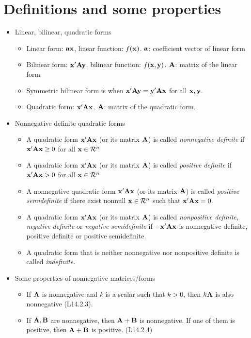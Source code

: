 \documentclass[a4paper, oneside]{book}
\begin{document}
\section{Definitions and some properties}
\begin{itemize}
\item Linear, bilinear, quadratic forms
	\begin{itemize}
	\item Linear form:  $\mathbf{ax}$, linear function: $f(\mathbf{x})$. $\mathbf{a}$: coefficient vector of linear form
	\item Bilinear form:  $\mathbf{x'Ay}$, bilinear function: $f(\mathbf{x,y})$. $\mathbf{A}$: matrix of the linear form
	\item Symmetric bilinear form is when $\mathbf{x'Ay} = \mathbf{y'Ax}$ for all $\mathbf{x,y}$.  
	\item Quadratic form: $\mathbf{x'Ax}$. $\mathbf{A}$: matrix of the quadratic form.
	\end{itemize}
\item Nonnegative definite quadratic forms
	\begin{itemize}
	\item A quadratic form $\mathbf{x'Ax}$ (or its matrix $\mathbf{A}$) is called \textit{nonnegative definite} if $\mathbf{x'Ax}\ge 0$ for all $\mathbf{x} \in \mathcal{R}^n$
	\item A quadratic form $\mathbf{x'Ax}$ (or its matrix $\mathbf{A}$) is called \textit{positive definite} if $\mathbf{x'Ax}> 0$ for all $\mathbf{x} \in \mathcal{R}^n$
	\item A nonnegative quadratic form $\mathbf{x'Ax}$ (or its matrix $\mathbf{A}$) is called \textit{positive semidefinite} if there exist nonnull $\mathbf{x}\in \mathcal{R}^n$ such that $\mathbf{x'Ax}=0$.
	\item A quadratic form  $\mathbf{x'Ax}$ (or its matrix $\mathbf{A}$) is called \textit{nonpositive definite}, \textit{negative definite} or \textit{negative semidefinite} if $-\mathbf{x'Ax}$ is nonnegative definite, positive definite or positive semidefinite.
	\item A quadratic form that is neither nonnegative nor nonpositive definite is called \textit{indefinite}.
	\end{itemize}
\item Some properties of nonnegative matrices/forms
	\begin{itemize}
	\item If $\mathbf{A}$ is nonnegative and $k$ is a scalar such that $k>0$, then $k\mathbf{A}$ is also nonnegative (L14.2.3).
	\item If $\mathbf{A},\mathbf{B}$ are nonnegative, then $\mathbf{A+B}$ is nonnegative. If one of them is positive, then $\mathbf{A+B}$ is positive. (L14.2.4)

\end{itemize}
\end{itemize}
\end{document}

